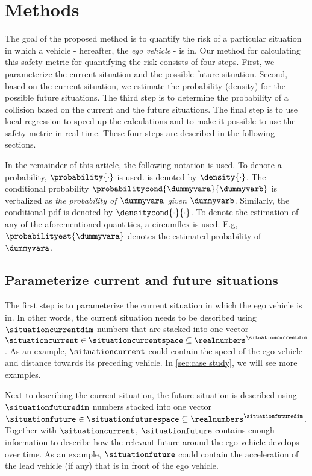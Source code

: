 \section{Methods}
\label{sec:methods}

The goal of the proposed method is to quantify the risk of a particular situation in which a vehicle - hereafter, the \textit{ego vehicle} - is in.
Our method for calculating this safety metric for quantifying the risk consists of four steps. 
First, we parameterize the current situation and the possible future situation.
Second, based on the current situation, we estimate the probability (density) for the possible future situations. 
The third step is to determine the probability of a collision based on the current and the future situations.
The final step is to use local regression to speed up the calculations and to make it possible to use the safety metric in real time. 
These four steps are described in the following sections.

In the remainder of this article, the following notation is used. 
To denote a probability, $\probability{\cdot}$ is used. 
 is denoted by $\density{\cdot}$. 
The conditional probability $\probabilitycond{\dummyvara}{\dummyvarb}$ is verbalized as \textit{the probability of $\dummyvara$ given $\dummyvarb$}. 
Similarly, the conditional \ac{pdf} is denoted by $\densitycond{\cdot}{\cdot}$. 
To denote the estimation of any of the aforementioned quantities, a circumflex is used. 
E.g, $\probabilityest{\dummyvara}$ denotes the estimated probability of $\dummyvara$.



\subsection{Parameterize current and future situations}
\label{sec:parametrization}

The first step is to parameterize the current situation in which the ego vehicle is in. 
In other words, the current situation needs to be described using $\situationcurrentdim$ numbers that are stacked into one vector $\situationcurrent \in \situationcurrentspace \subseteq \realnumbers^{\situationcurrentdim}$. 
As an example, $\situationcurrent$ could contain the speed of the ego vehicle and distance towards its preceding vehicle. 
In \cref{sec:case study}, we will see more examples.

Next to describing the current situation, the future situation is described using $\situationfuturedim$ numbers stacked into one vector $\situationfuture \in \situationfuturespace \subseteq \realnumbers^{\situationfuturedim}$. 
Together with $\situationcurrent$, $\situationfuture$ contains enough information to describe how the relevant future around the ego vehicle develops over time. 
As an example, $\situationfuture$ could contain the acceleration of the lead vehicle (if any) that is in front of the ego vehicle.

